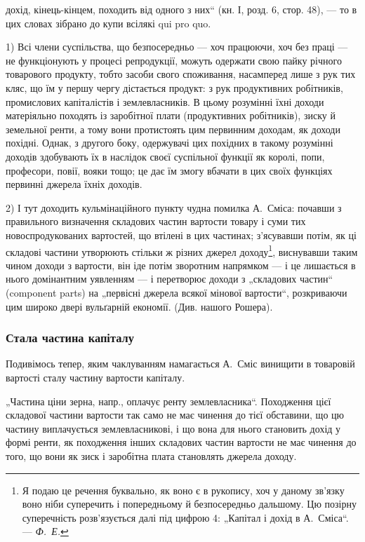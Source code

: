 \parcont{}  %
дохід, кінець-кінцем, походить від одного з них“ (кн. І, розд. 6,
стор. 48), — то в цих словах зібрано до купи всілякі qui pro quo.

1) Всі члени суспільства, що безпосередньо — хоч працюючи, хоч
без праці — не функціонують у процесі репродукції, можуть одержати
свою пайку річного товарового продукту, тобто засоби свого споживання,
насамперед лише з рук тих кляс, що їм у першу чергу дістається
продукт: з рук продуктивних робітників, промислових капіталістів і
землевласників. В цьому розумінні їхні доходи матеріяльно походять із
заробітної плати (продуктивних робітників), зиску й земельної ренти, а
тому вони протистоять цим первинним доходам, як доходи похідні.
Однак, з другого боку, одержувачі цих похідних в такому розумінні доходів
здобувають їх в наслідок своєї суспільної функції як королі,
попи, професори, повії, вояки тощо; це дає їм змогу вбачати в цих
своїх функціях первинні джерела їхніх доходів.

2) І тут доходить кульмінаційного пункту чудна помилка А.~Сміса:
почавши з правильного визначення складових частин вартости товару і
суми тих новоспродукованих вартостей, що втілені в цих частинах; з’ясувавши
потім, як ці складові частини утворюють стільки ж різних
джерел доходу\footnote{
Я подаю це речення буквально, як воно є в рукопису, хоч у даному зв’язку
воно ніби суперечить і попередньому й безпосередньо дальшому. Цю позірну
суперечність розв’язується далі під цифрою 4: „Капітал і дохід в А.~Сміса“. 
— \emph{Ф.~Е.}
}, виснувавши таким чином доходи з вартости, він іде
потім зворотним напрямком — і це лишається в нього домінантним уявленням
— і перетворює доходи з „складових частин“ (component parts)
на „первісні джерела всякої мінової вартости“, розкриваючи цим
широко двері вульґарній економії. (Див. нашого Рошера).

\subsubsection{Стала частина капіталу}

Подивімось тепер, яким чаклуванням намагається А.~Сміс винищити
в товаровій вартості сталу частину вартости капіталу.

„Частина ціни зерна, напр., оплачує ренту землевласника“. Походження
цієї складової частини вартости так само не має чинення до тієї
обставини, що цю частину виплачується землевласникові, і що вона для
нього становить дохід у формі ренти, як походження інших складових
частин вартости не має чинення до того, що вони як зиск і заробітна
плата становлять джерела доходу.

